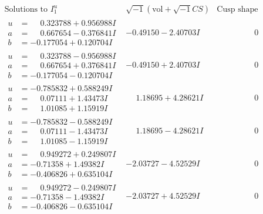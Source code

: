 \documentclass[1p]{elsarticle_modified}
\theoremstyle{definition}
\newcommand{\I}{\sqrt{-1}}
\begin{document}
$$\begin{array}{c|c|c}  
\text{Solutions to }I^u_{1}& \I (\text{vol} + \sqrt{-1}CS) & \text{Cusp shape}\\
 \hline 
\begin{aligned}
u &= \phantom{-}0.323788 + 0.956988 I \\
a &= \phantom{-}0.667654 - 0.376841 I \\
b &= -0.177054 + 0.120704 I\end{aligned}
 & -0.49150 - 2.40703 I & \phantom{-0.000000 } 0 \\ \hline\begin{aligned}
u &= \phantom{-}0.323788 - 0.956988 I \\
a &= \phantom{-}0.667654 + 0.376841 I \\
b &= -0.177054 - 0.120704 I\end{aligned}
 & -0.49150 + 2.40703 I & \phantom{-0.000000 } 0 \\ \hline\begin{aligned}
u &= -0.785832 + 0.588249 I \\
a &= \phantom{-}0.07111 + 1.43473 I \\
b &= \phantom{-}1.01085 + 1.15919 I\end{aligned}
 & \phantom{-}1.18695 + 4.28621 I & \phantom{-0.000000 } 0 \\ \hline\begin{aligned}
u &= -0.785832 - 0.588249 I \\
a &= \phantom{-}0.07111 - 1.43473 I \\
b &= \phantom{-}1.01085 - 1.15919 I\end{aligned}
 & \phantom{-}1.18695 - 4.28621 I & \phantom{-0.000000 } 0 \\ \hline\begin{aligned}
u &= \phantom{-}0.949272 + 0.249807 I \\
a &= -0.71358 + 1.49382 I \\
b &= -0.406826 + 0.635104 I\end{aligned}
 & -2.03727 - 4.52529 I & \phantom{-0.000000 } 0 \\ \hline\begin{aligned}
u &= \phantom{-}0.949272 - 0.249807 I \\
a &= -0.71358 - 1.49382 I \\
b &= -0.406826 - 0.635104 I\end{aligned}
 & -2.03727 + 4.52529 I & \phantom{-0.000000 } 0 \\ \hline\begin{aligned}

\end{aligned}
\end{array}$$
\end{document}

